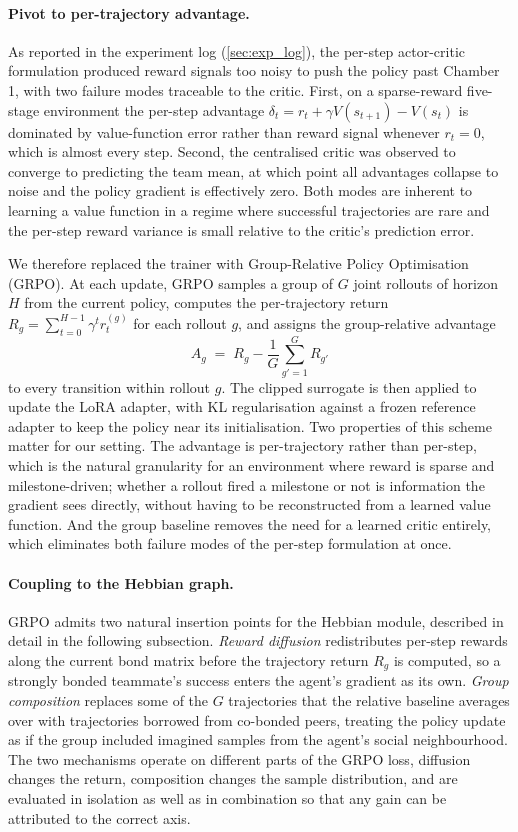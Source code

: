 \documentclass{article}
\theoremstyle{plain}
\theoremstyle{definition}
\theoremstyle{remark}
\begin{document}
\paragraph{Pivot to per-trajectory advantage.}
As reported in the experiment log (\autoref{sec:exp_log}), the per-step actor-critic formulation produced reward signals too noisy to push the policy past Chamber 1, with two failure modes traceable to the critic. First, on a sparse-reward five-stage environment the per-step advantage $\delta_t = r_t + \gamma V(s_{t+1}) - V(s_t)$ is dominated by value-function error rather than reward signal whenever $r_t = 0$, which is almost every step. Second, the centralised critic was observed to converge to predicting the team mean, at which point all advantages collapse to noise and the policy gradient is effectively zero. Both modes are inherent to learning a value function in a regime where successful trajectories are rare and the per-step reward variance is small relative to the critic's prediction error.

We therefore replaced the trainer with Group-Relative Policy Optimisation (GRPO). At each update, GRPO samples a group of $G$ joint rollouts of horizon $H$ from the current policy, computes the per-trajectory return $R_g = \sum_{t=0}^{H-1} \gamma^t r_t^{(g)}$ for each rollout $g$, and assigns the group-relative advantage
\[
A_g \;=\; R_g - \frac{1}{G}\sum_{g'=1}^{G} R_{g'}
\]
to every transition within rollout $g$. The clipped surrogate is then applied to update the LoRA adapter, with KL regularisation against a frozen reference adapter to keep the policy near its initialisation. Two properties of this scheme matter for our setting. The advantage is per-trajectory rather than per-step, which is the natural granularity for an environment where reward is sparse and milestone-driven; whether a rollout fired a milestone or not is information the gradient sees directly, without having to be reconstructed from a learned value function. And the group baseline removes the need for a learned critic entirely, which eliminates both failure modes of the per-step formulation at once.

\paragraph{Coupling to the Hebbian graph.}
GRPO admits two natural insertion points for the Hebbian module, described in detail in the following subsection. \emph{Reward diffusion} redistributes per-step rewards along the current bond matrix before the trajectory return $R_g$ is computed, so a strongly bonded teammate's success enters the agent's gradient as its own. \emph{Group composition} replaces some of the $G$ trajectories that the relative baseline averages over with trajectories borrowed from co-bonded peers, treating the policy update as if the group included imagined samples from the agent's social neighbourhood. The two mechanisms operate on different parts of the GRPO loss, diffusion changes the return, composition changes the sample distribution, and are evaluated in isolation as well as in combination so that any gain can be attributed to the correct axis.
\end{document}
